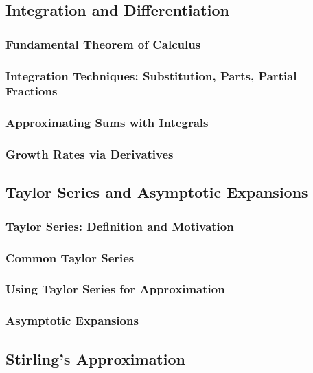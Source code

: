 \subsection{Integration and Differentiation}
\label{subsec:calculus}

\subsubsection{Fundamental Theorem of Calculus}
\subsubsection{Integration Techniques: Substitution, Parts, Partial Fractions}
\subsubsection{Approximating Sums with Integrals}
\subsubsection{Growth Rates via Derivatives}

\subsection{Taylor Series and Asymptotic Expansions}
\label{subsec:taylor-series}

\subsubsection{Taylor Series: Definition and Motivation}
\subsubsection{Common Taylor Series}
\subsubsection{Using Taylor Series for Approximation}
\subsubsection{Asymptotic Expansions}

\subsection{Stirling's Approximation}
\label{subsec:stirling}

